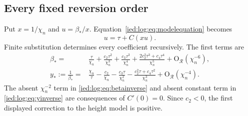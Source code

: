 \documentclass[11pt,letterpaper]{article}
\theoremstyle{remark}\newtheorem{remark}[theorem]{Remark}
\newcommand{\Oh}{\mathrm O}\newcommand{\supp}{\operatorname{supp}}
\begin{document}
\subsection{Every fixed reversion order}
Put $x=1/\chi_n$ and $u=\beta_*/x$. Equation~\eqref{ied:log:eq:modelequation} becomes
\begin{equation}\label{ied:log:eq:ureversion}
 u=\tau+C(xu).
\end{equation}
Finite substitution determines every coefficient recursively. The first terms are
\begin{align}\label{ied:log:eq:betainverse}
 \beta_*={}&\frac\tau{\chi_n}+\frac{c_2\tau^2}{\chi_n^3}
 +\frac{c_3\tau^3}{\chi_n^4}
 +\frac{2c_2^2\tau^3+c_4\tau^4}{\chi_n^5}
 +\Oh_{\mathcal R}(\chi_n^{-6}),\\
 y_*:=\frac1{\beta_*}={}&\frac{\chi_n}\tau-\frac{c_2}{\chi_n}
 -\frac{c_3\tau}{\chi_n^2}
 -\frac{c_2^2\tau+c_4\tau^2}{\chi_n^3}
 +\Oh_{\mathcal R}(\chi_n^{-4}).\label{ied:log:eq:yinverse}
\end{align}
The absent $\chi_n^{-2}$ term in \eqref{ied:log:eq:betainverse} and absent constant term in \eqref{ied:log:eq:yinverse} are consequences of $C'(0)=0$. Since $c_2<0$, the first displayed correction to the height model is positive.
\end{document}
